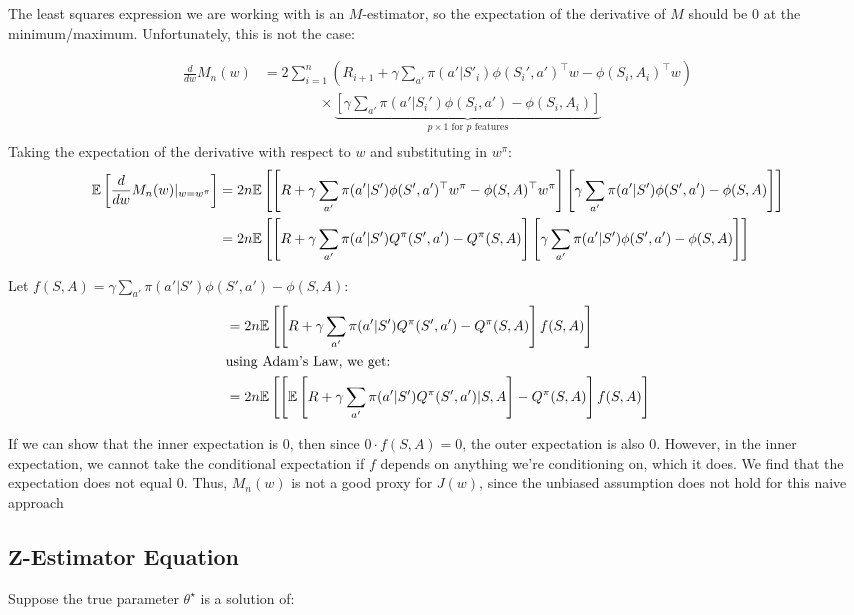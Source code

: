 \documentclass[11pt]{article}
\begin{document}
The least squares expression we are working with is an $M$-estimator, so the expectation of the derivative of $M$ should be 0 at the minimum/maximum. Unfortunately, this is not the case:

\begin{align*}
  \frac{d}{dw}M_n(w) &= 2\sum_{i=1}^n\left(R_{i+1} + \gamma \sum_{a'} \pi(a'|S'_{i})\phi(S_i', a')^\top w - \phi(S_i, A_i)^\top w \right) \\
  &\quad \quad \quad \quad \times \underbrace{\left[\gamma \sum_{a'} \pi(a'|S_i')\phi(S_i, a') - \phi(S_i, A_i)\right]}_{\text{$p \times 1$ for $p$ features}}\\
\end{align*}
Taking the expectation of the derivative with respect to $w$ and substituting in $w^\pi$:
\begin{align*}
  \mathbb{E}\left[ \frac{d}{dw} M_n(w) |_{w=w^\pi} \right] &=2n \mathbb{E}\left[ \left[R + \gamma \sum_{a'} \pi(a'|S')\phi(S',a')^\top w^\pi - \phi(S,A)^\top w^\pi\right]\left[\gamma \sum_{a'} \pi(a'|S')\phi(S',a') - \phi(S,A)\right] \right] \\
&= 2n\mathbb{E}\left[ \left[R + \gamma \sum_{a'} \pi(a'|S')Q^\pi(S', a') - Q^\pi(S, A)\right]\left[\gamma \sum_{a'} \pi(a'|S')\phi(S',a') - \phi(S,A)\right] \right]
\end{align*}

Let $f(S, A) = \gamma \sum_{a'} \pi(a'|S')\phi(S',a') - \phi(S,A)$:
\begin{align*}
&= 2n\mathbb{E}\left[ \left[R+\gamma \sum_{a'} \pi(a'|S')Q^\pi(S', a') - Q^\pi(S,A)\right]f(S,A) \right] \\ 
& \text{using Adam's Law, we get:} \\
&= 2n\mathbb{E}\left[ \left[\mathbb{E}\left[ R+\gamma \sum_{a'} \pi(a'|S')Q^\pi(S', a')|S,A \right] - Q^\pi(S,A)\right]f(S,A) \right]
\end{align*}

If we can show that the inner expectation is 0, then since $0 \cdot f(S, A) = 0$, the outer expectation is also 0. However, in the inner expectation, we cannot take the conditional expectation if $f$ depends on anything we're conditioning on, which it does. We find that the expectation does not equal 0. Thus, $M_n(w)$ is not a good proxy for $J(w)$, since the unbiased assumption does not hold for this naive approach

\subsection{$\boldsymbol{Z}$-Estimator Equation}

Suppose the true parameter $\theta^\star$ is a solution of:
\end{document}
